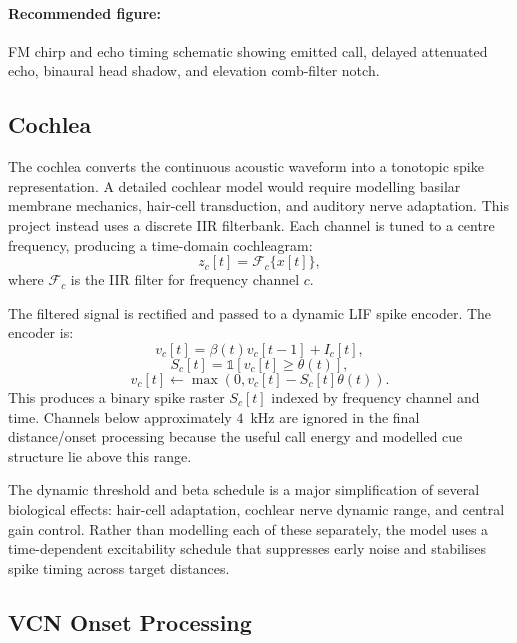 \paragraph{Recommended figure:} FM chirp and echo timing schematic showing emitted call, delayed attenuated echo, binaural head shadow, and elevation comb-filter notch.

\subsection{Cochlea}

The cochlea converts the continuous acoustic waveform into a tonotopic spike representation. A detailed cochlear model would require modelling basilar membrane mechanics, hair-cell transduction, and auditory nerve adaptation. This project instead uses a discrete IIR filterbank. Each channel is tuned to a centre frequency, producing a time-domain cochleagram:
\begin{equation}
    z_c[t] = \mathcal{F}_c\{x[t]\},
\end{equation}
where $\mathcal{F}_c$ is the IIR filter for frequency channel $c$.

The filtered signal is rectified and passed to a dynamic LIF spike encoder. The encoder is:
\begin{equation}
    v_c[t] = \beta(t)v_c[t-1] + I_c[t],
\end{equation}
\begin{equation}
    S_c[t] = \mathbb{1}\left[v_c[t] \geq \theta(t)\right],
\end{equation}
\begin{equation}
    v_c[t] \leftarrow \max(0, v_c[t] - S_c[t]\theta(t)).
\end{equation}
This produces a binary spike raster $S_c[t]$ indexed by frequency channel and time. Channels below approximately $4$~kHz are ignored in the final distance/onset processing because the useful call energy and modelled cue structure lie above this range.

The dynamic threshold and beta schedule is a major simplification of several biological effects: hair-cell adaptation, cochlear nerve dynamic range, and central gain control. Rather than modelling each of these separately, the model uses a time-dependent excitability schedule that suppresses early noise and stabilises spike timing across target distances.

\subsection{VCN Onset Processing}

